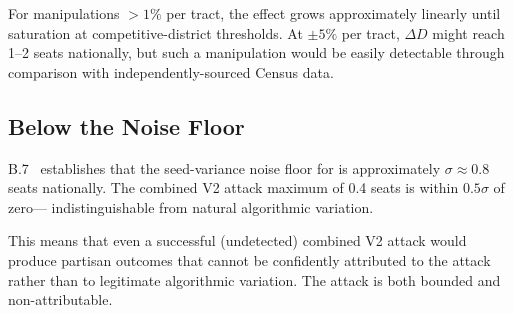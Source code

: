 For manipulations $> 1\%$ per tract, the effect grows approximately
linearly until saturation at competitive-district thresholds.
At $\pm 5\%$ per tract, $\Delta D$ might reach 1--2 seats nationally,
but such a manipulation would be easily detectable through comparison
with independently-sourced Census data.

\subsection{Below the Noise Floor}

B.7~\citep{b7paper} establishes that the seed-variance noise floor for
\bisect{} is approximately $\sigma \approx 0.8$ seats nationally.
The combined V2 attack maximum of 0.4 seats is within $0.5\sigma$ of zero---
indistinguishable from natural algorithmic variation.

This means that even a successful (undetected) combined V2 attack would
produce partisan outcomes that cannot be confidently attributed to the
attack rather than to legitimate algorithmic variation.
The attack is both bounded and non-attributable.
